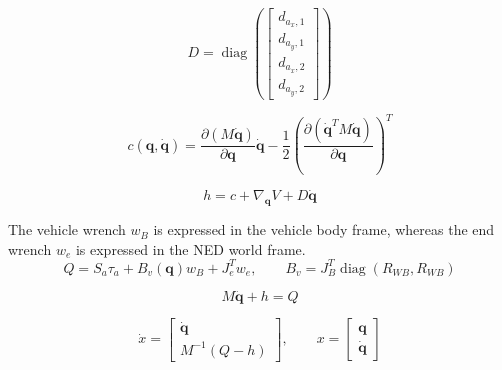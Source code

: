 \documentclass[11pt]{article}
\begin{document}
\begin{equation}
D=\operatorname{diag}\!\left(\begin{bmatrix}d_{a_x,1}\\d_{a_y,1}\\d_{a_x,2}\\d_{a_y,2}\end{bmatrix}\right)
\end{equation}

\begin{equation}
c(\boldsymbol q,\dot{\boldsymbol q})=\frac{\partial(M\dot{\boldsymbol q})}{\partial\boldsymbol q}\dot{\boldsymbol q}-\frac12\left(\frac{\partial(\dot{\boldsymbol q}^{T}M\dot{\boldsymbol q})}{\partial\boldsymbol q}\right)^T
\end{equation}

\begin{equation}
h=c+\nabla_{\boldsymbol q}V+D\dot{\boldsymbol q}
\end{equation}

The vehicle wrench $w_B$ is expressed in the vehicle body frame, whereas the end wrench $w_e$ is expressed in the NED world frame.
\begin{equation}
Q=S_a\tau_a+B_v(\boldsymbol q)w_B+J_e^Tw_e,\qquad B_v=J_B^T\operatorname{diag}(R_{WB},R_{WB})
\end{equation}

\begin{equation}
M\ddot{\boldsymbol q}+h=Q\label{eq:dynamics}
\end{equation}

\begin{equation}
\dot x=\begin{bmatrix}\dot{\boldsymbol q}\\M^{-1}(Q-h)\end{bmatrix},\qquad x=\begin{bmatrix}\boldsymbol q\\\dot{\boldsymbol q}\end{bmatrix}
\end{equation}
\end{document}
